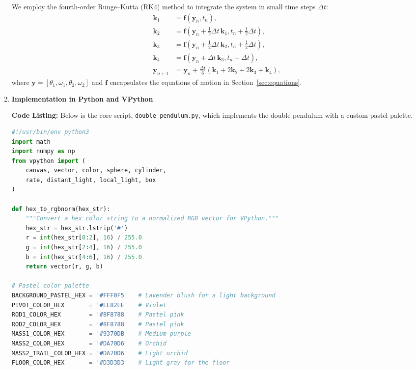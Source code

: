 \documentclass[letterpaper,12pt]{article}
\begin{document}
\begin{enumerate}[leftmargin=*, itemsep=1em]
We employ the fourth-order Runge–Kutta (RK4) method to integrate the system in small time steps $\Delta t$:
\[
\begin{aligned}
\mathbf{k}_1 &= \mathbf{f}(\mathbf{y}_n, t_n), \\
\mathbf{k}_2 &= \mathbf{f}(\mathbf{y}_n + \tfrac{1}{2}\Delta t\,\mathbf{k}_1, t_n + \tfrac{1}{2}\Delta t), \\
\mathbf{k}_3 &= \mathbf{f}(\mathbf{y}_n + \tfrac{1}{2}\Delta t\,\mathbf{k}_2, t_n + \tfrac{1}{2}\Delta t), \\
\mathbf{k}_4 &= \mathbf{f}(\mathbf{y}_n + \Delta t\,\mathbf{k}_3, t_n + \Delta t), \\
\mathbf{y}_{n+1} &= \mathbf{y}_n + \frac{\Delta t}{6}(\mathbf{k}_1 + 2\mathbf{k}_2 + 2\mathbf{k}_3 + \mathbf{k}_4),
\end{aligned}
\]
where $\mathbf{y} = [\theta_1, \omega_1, \theta_2, \omega_2]$ and $\mathbf{f}$ encapsulates the equations of motion in Section~\ref{sec:equations}.

\item \textbf{Implementation in Python and VPython}
\label{sec:implementation}

\textbf{Code Listing:} Below is the core script,
\texttt{double\_pendulum.py},
which implements the double pendulum with a custom pastel palette.

\begin{lstlisting}[language=Python, caption=Double Pendulum Simulation with Pastel Palette, label=lst:doublependulum]
#!/usr/bin/env python3
import math
import numpy as np
from vpython import (
    canvas, vector, color, sphere, cylinder,
    rate, distant_light, local_light, box
)

def hex_to_rgbnorm(hex_str):
    """Convert a hex color string to a normalized RGB vector for VPython."""
    hex_str = hex_str.lstrip('#')
    r = int(hex_str[0:2], 16) / 255.0
    g = int(hex_str[2:4], 16) / 255.0
    b = int(hex_str[4:6], 16) / 255.0
    return vector(r, g, b)

# Pastel color palette
BACKGROUND_PASTEL_HEX = '#FFF0F5'   # Lavender blush for a light background
PIVOT_COLOR_HEX       = '#EE82EE'   # Violet
ROD1_COLOR_HEX        = '#8F8788'   # Pastel pink
ROD2_COLOR_HEX        = '#8F8788'   # Pastel pink
MASS1_COLOR_HEX       = '#9370DB'   # Medium purple
MASS2_COLOR_HEX       = '#DA70D6'   # Orchid
MASS2_TRAIL_COLOR_HEX = '#DA70D6'   # Light orchid
FLOOR_COLOR_HEX       = '#D3D3D3'   # Light gray for the floor


\end{lstlisting}
\end{enumerate}
\end{document}
